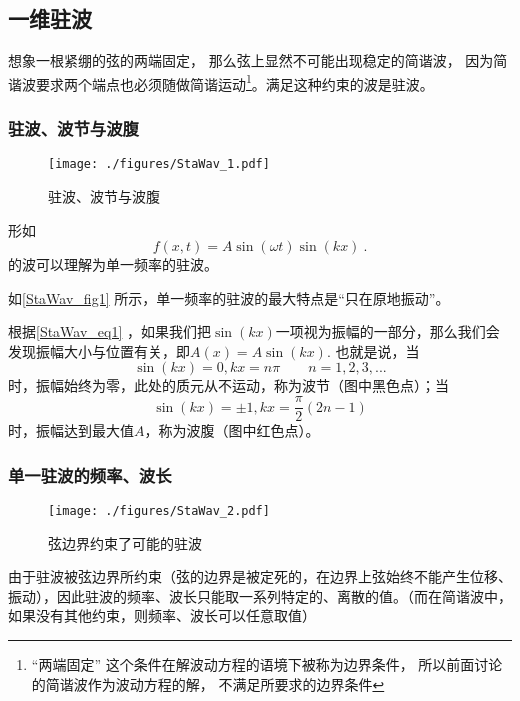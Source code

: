 
\begin{issues}
\issueDraft
\end{issues}


\subsection{一维驻波}
想象一根紧绷的弦的两端固定， 那么弦上显然不可能出现稳定的简谐波， 因为简谐波要求两个端点也必须随做简谐运动\footnote{“两端固定” 这个条件在解波动方程的语境下被称为边界条件， 所以前面讨论的简谐波作为波动方程的解， 不满足所要求的边界条件}。满足这种约束的波是驻波。

\subsubsection{驻波、波节与波腹}
\begin{figure}[ht]
\centering
\texttt{[image: ./figures/StaWav\_1.pdf]}
\caption{驻波、波节与波腹} \label{StaWav_fig1}
\end{figure}

形如
\begin{equation}\label{StaWav_eq1}
f(x,t)=A\sin(\omega t)\sin(kx)~.
\end{equation}
的波可以理解为单一频率的驻波。

如\autoref{StaWav_fig1} 所示，单一频率的驻波的最大特点是“只在原地振动”。

根据\autoref{StaWav_eq1} ，如果我们把$\sin(kx)$一项视为振幅的一部分，那么我们会发现振幅大小与位置有关，即$A(x) = A \sin(kx)$. 也就是说，当$$\sin(kx)=0, kx=n\pi \qquad n=1,2,3,...$$时，振幅始终为零，此处的质元从不运动，称为波节（图中黑色点）；当$$\sin(kx)=\pm1, kx=\frac{\pi}{2} (2n-1)$$时，振幅达到最大值$A$，称为波腹（图中红色点）。

\subsubsection{单一驻波的频率、波长}
\begin{figure}[ht]
\centering
\texttt{[image: ./figures/StaWav\_2.pdf]}
\caption{弦边界约束了可能的驻波} \label{StaWav_fig2}
\end{figure}

由于驻波被弦边界所约束（弦的边界是被定死的，在边界上弦始终不能产生位移、振动），因此驻波的频率、波长只能取一系列特定的、离散的值。（而在简谐波中，如果没有其他约束，则频率、波长可以任意取值）

